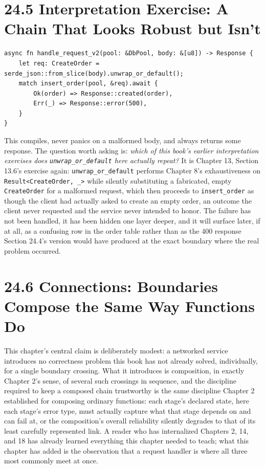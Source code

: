 \documentclass[11pt]{book}
\begin{document}
\section*{24.5 Interpretation Exercise: A Chain That Looks Robust but Isn't}

\begin{lstlisting}
async fn handle_request_v2(pool: &DbPool, body: &[u8]) -> Response {
    let req: CreateOrder = serde_json::from_slice(body).unwrap_or_default();
    match insert_order(pool, &req).await {
        Ok(order) => Response::created(order),
        Err(_) => Response::error(500),
    }
}
\end{lstlisting}

This compiles, never panics on a malformed body, and always returns some response. The question worth asking is: \emph{which of this book's earlier interpretation exercises does \texttt{unwrap\_or\_default} here actually repeat?} It is Chapter 13, Section 13.6's exercise again: \texttt{unwrap\_or\_default} performs Chapter 8's exhaustiveness on \texttt{Result<CreateOrder, \_>} while silently substituting a fabricated, empty \texttt{CreateOrder} for a malformed request, which then proceeds to \texttt{insert\_order} as though the client had actually asked to create an empty order, an outcome the client never requested and the service never intended to honor. The failure has not been handled, it has been hidden one layer deeper, and it will surface later, if at all, as a confusing row in the order table rather than as the 400 response Section 24.4's version would have produced at the exact boundary where the real problem occurred.

\section*{24.6 Connections: Boundaries Compose the Same Way Functions Do}

This chapter's central claim is deliberately modest: a networked service introduces no correctness problem this book has not already solved, individually, for a single boundary crossing. What it introduces is composition, in exactly Chapter 2's sense, of several such crossings in sequence, and the discipline required to keep a composed chain trustworthy is the same discipline Chapter 2 established for composing ordinary functions: each stage's declared state, here each stage's error type, must actually capture what that stage depends on and can fail at, or the composition's overall reliability silently degrades to that of its least carefully represented link. A reader who has internalized Chapters 2, 14, and 18 has already learned everything this chapter needed to teach; what this chapter has added is the observation that a request handler is where all three most commonly meet at once.
\end{document}
